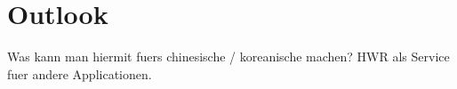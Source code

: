 
\chapter{Outlook}
Was kann man hiermit fuers chinesische / koreanische machen?
HWR als Service fuer andere Applicationen.
